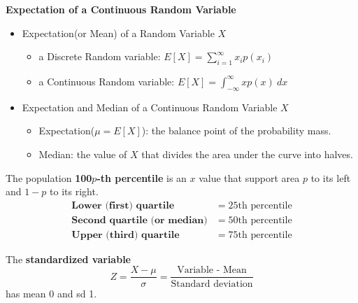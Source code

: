 \documentclass[12pt,openany]{book}
\theoremstyle{definition}
\begin{document}
	\begin{tcolorbox}[colback=white]
		\begin{center}
			\textbf{Expectation of a Continuous Random Variable}
		\end{center}\begin{itemize}
			\item Expectation(or Mean) of a Random Variable $X$\begin{itemize}
				\item a Discrete Random variable: $E[X]=\sum_{i=1}^\infty x_ip(x_i)$
				\item a Continuous Random variable: $E[X]=\int_{-\infty}^\infty xp(x)\ dx$
			\end{itemize}
			\item Expectation and Median of a Continuous Random Variable $X$\begin{itemize}
				\item Expectation($\mu=E[X]$): the balance point of the probability mass.
				\item Median: the value of $X$ that divides the area under the curve into halves.
			\end{itemize}
		\end{itemize}
	\end{tcolorbox}
	\begin{tcolorbox}[colback=white]
		The population \textbf{100$p$-th percentile} is an $x$ value that support area $p$ to its left and $1-p$ to its right. \begin{align*}
			\textbf{Lower (first) quartile} &= 25\text{th percentile} \\
			\textbf{Second quartile (or median)} &= 50\text{th percentile} \\
			\textbf{Upper (third) quartile} &= 75\text{th percentile}
		\end{align*}
	\end{tcolorbox}
	
	\begin{tcolorbox}[colback=white]
		The \textbf{standardized variable} \[
		Z = \frac{X-\mu}{\sigma}=\frac{\text{Variable - Mean}}{\text{Standard deviation}}
		\] has mean $0$ and sd 1.
	\end{tcolorbox}
	
\end{document}
